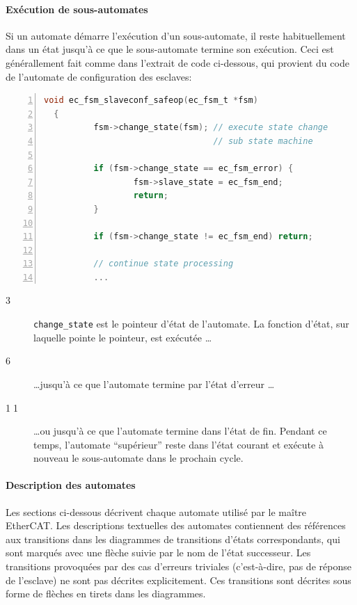 \documentclass[a4paper,12pt,BCOR6mm,bibtotoc,idxtotoc]{scrbook}
\newcommand{\linenum}[1]{\normalfont\textcircled{\tiny #1}}
\begin{document}
\paragraph{Ex\'ecution de sous-automates}

Si un automate d\'emarre l'ex\'ecution d'un sous-automate, il reste
habituellement dans un \'etat jusqu'\`a ce que le sous-automate
termine son ex\'ecution.  Ceci est g\'en\'erallement fait comme dans
l'extrait de code ci-dessous, qui provient du code de l'automate de
configuration des esclaves:

\begin{lstlisting}[gobble=2,language=C,numbers=left]
  void ec_fsm_slaveconf_safeop(ec_fsm_t *fsm)
  {
          fsm->change_state(fsm); // execute state change
                                  // sub state machine

          if (fsm->change_state == ec_fsm_error) {
                  fsm->slave_state = ec_fsm_end;
                  return;
          }

          if (fsm->change_state != ec_fsm_end) return;

          // continue state processing
          ...
\end{lstlisting}

\begin{description}

\item[\linenum{3}] \lstinline+change_state+ est le pointeur d'\'etat
  de l'automate. La fonction d'\'etat, sur laquelle pointe le
  pointeur, est ex\'ecut\'ee \ldots

\item[\linenum{6}] \ldots jusqu'\`a ce que l'automate termine par
  l'\'etat d'erreur \ldots

\item[\linenum{11}] \ldots ou jusqu'\`a ce que l'automate termine dans
  l'\'etat de fin. Pendant ce temps, l'automate ``sup\'erieur'' reste
  dans l'\'etat courant et ex\'ecute \`a nouveau le sous-automate dans
  le prochain cycle.

\end{description}

\paragraph{Description des automates}

Les sections ci-dessous d\'ecrivent chaque automate utilis\'e par le
ma\^itre EtherCAT.  Les descriptions textuelles des automates contiennent
des r\'ef\'erences aux transitions dans les diagrammes de transitions
d'\'etats correspondants, qui sont marqu\'es avec une fl\`eche suivie par le
nom de l'\'etat successeur.  Les transitions provoqu\'ees par des cas
d'erreurs triviales (c'est-\`a-dire, pas de r\'eponse de l'esclave) ne
sont pas d\'ecrites explicitement. Ces transitions sont d\'ecrites sous
forme de fl\`eches en tirets dans les diagrammes.
\end{document}
